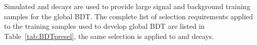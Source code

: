 Simulated \bsmumu and \bbbarmumux decays are used to provide large signal and background training samples for the global BDT. %
The complete list of selection requirements applied to the training samples used to develop global BDT are listed in Table~\ref{tab:BDTpresel}, the same selection is applied to \bsmumu and \bbbarmumux decays.  
